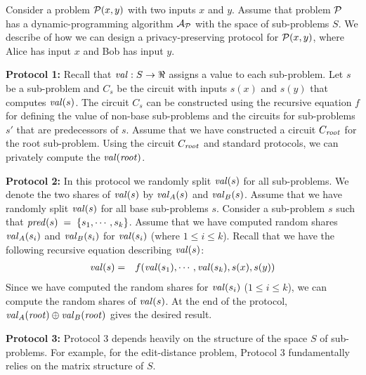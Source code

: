 Consider a problem ${\cal P}(x,y)$ with two inputs $x$ and $y$. Assume
that problem ${\cal P}$ has a dynamic-programming algorithm ${\cal
A}_{\cal P}$ with the space of sub-problems $S$. We describe of how we
can design a privacy-preserving protocol for ${\cal P}(x,y)$, where
Alice has input $x$ and Bob has input $y$.

\noindent
{\bf Protocol 1:} Recall that ${\it val}: S \rightarrow \Re$ assigns a
value to each sub-problem. Let $s$ be a sub-problem and $C_s$ be the
circuit with inputs $s(x)$ and $s(y)$ that computes ${\it
val}(s)$. The circuit $C_s$ can be constructed using the recursive
equation $f$ for defining the value of non-base sub-problems and the
circuits for sub-problems $s'$ that are predecessors of $s$. Assume
that we have constructed a circuit $C_{\it root}$ for the root
sub-problem. Using the circuit $C_{\it root}$ and standard protocols,
we can privately compute the ${\it val} ({\it root})$.

\noindent
{\bf Protocol 2:} In this protocol we randomly split ${\it val} (s)$
for all sub-problems. We denote the two shares of ${\it val}(s)$ by
${\it val}_A (s)$ and ${\it val}_B (s)$. Assume that we have randomly
split ${\it val} (s)$ for all base sub-problems $s$. Consider a 
sub-problem $s$ such that ${\it pred} (s) \; = \; \{ s_1 , \cdots, s_k \}$.
Assume that we have computed random shares ${\it val}_A (s_i)$ and
${\it val}_B (s_i)$ for ${\it val} (s_i)$ (where $1 \leq i \leq k$). Recall
that we have the following recursive equation describing ${\it val} (s)$:
\begin{eqnarray*}
{\it val}(s) & = & f ( {\it val}(s_1),\cdots,{\it val} (s_k),s(x),s(y))
\end{eqnarray*}
Since we have computed the random shares for ${\it val}(s_i)$ ($1 \leq
i \leq k$), we can compute the random shares of ${\it val} (s)$. At
the end of the protocol, ${\it val}_A ({\it root}) \oplus {\it val}_B ({\it
root})$ gives the desired result.

\noindent
{\bf Protocol 3:}
Protocol 3 depends heavily on the structure of the space $S$ of
sub-problems.  For example, for the edit-distance problem, Protocol 3
fundamentally relies on the matrix structure of $S$.

